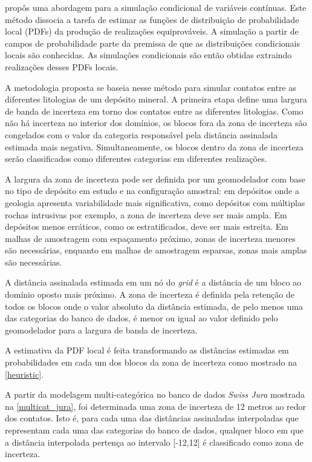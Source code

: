  propôs uma abordagem para a simulação condicional de variáveis contínuas. Este método dissocia a tarefa de estimar as funções de distribuição de probabilidade local (PDFs) da produção de realizações equiprováveis. A simulação a partir de campos de probabilidade parte da premissa de que as distribuições condicionais locais são conhecidas. As simulações condicionais são então obtidas extraindo realizações desses PDFs locais.

A metodologia proposta se baseia nesse método para simular contatos entre as diferentes litologias de um depósito mineral. A primeira etapa define uma largura de banda de incerteza em torno dos contatos entre as diferentes litologias. Como não há incerteza no interior dos domínios, os blocos fora da zona de incerteza são congelados com o valor da categoria responsável pela distância assinalada estimada mais negativa. Simultaneamente, os blocos dentro da zona de incerteza serão classificados como diferentes categorias em diferentes realizações.

A largura da zona de incerteza pode ser definida por um geomodelador com base no tipo de depósito em estudo e na configuração amostral: em depósitos onde a geologia apresenta variabilidade mais significativa, como depósitos com múltiplas rochas intrusivas por exemplo, a zona de incerteza deve ser mais ampla. Em depósitos menos erráticos, como os estratificados, deve ser mais estreita. Em malhas de amostragem com espaçamento próximo, zonas de incerteza menores são necessárias, enquanto em malhas de amostragem esparsas, zonas mais amplas são necessárias.

A distância assinalada estimada em um nó do \textit{grid} é a distância de um bloco ao domínio oposto mais próximo. A zona de incerteza é definida pela retenção de todos os blocos onde o valor absoluto da distância estimada, de pelo menos uma das categorias do banco de dados, é menor ou igual ao valor definido pelo geomodelador para a largura de banda de incerteza.

A estimativa da PDF local é feita transformando as distâncias estimadas em probabilidades em cada um dos blocos da zona de incerteza como mostrado na \autoref{heuristic}.

A partir da modelagem multi-categórica no banco de dados \textit{Swiss Jura} mostrada na \autoref{multicat_jura}, foi determinada uma zona de incerteza de 12 metros ao redor dos contatos. Isto é, para cada uma das distâncias assinaladas interpoladas que representam cada uma das categorias do banco de dados, qualquer bloco em que a distância interpolada pertença ao intervalo [-12,12] é classificado como zona de incerteza.

